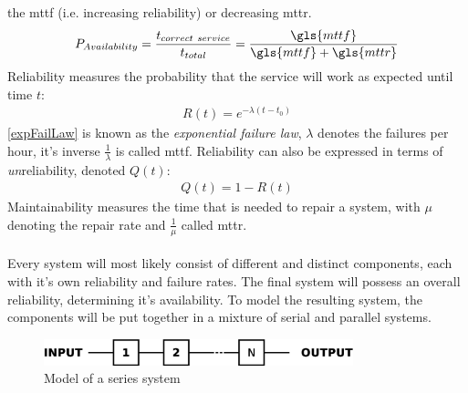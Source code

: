 the \gls{mttf} (i.e. increasing reliability) or decreasing \gls{mttr}.
\begin{align}\label{EQUavailability}
 P_{Availability} = \frac{t_{correct\ service}}{t_{total}} =  \frac{{\gls{mttf}}}{\gls{mttf}+\gls{mttr}}
\end{align}
Reliability measures the probability that the service will work as expected until time $t$:
\begin{align}\label{expFailLaw}
 R(t) = e^{-\lambda(t-t_0)}
\end{align}
\ref{expFailLaw} is known as the \textit{exponential failure law}, $\lambda$ denotes the failures per hour, it's inverse $\frac{1}{\lambda}$ is
called \gls{mttf}. Reliability can also be expressed in terms of \textit{un}reliability, denoted $Q(t)$:
\begin{align}
 Q(t) = 1 - R(t)
\end{align}
Maintainability measures the time that is needed to repair a system, with $\mu$ denoting the repair rate and $\frac{1}{\mu}$ called \gls{mttr}.
\\
\\
Every system will most likely consist of different and distinct components, each with it's own reliability and failure rates. The final system
will possess an overall reliability, determining it's availability. To model the resulting system, the components will be put together in a mixture of
serial and parallel systems.
\begin{figure}
    \centering
    \includegraphics[width=0.8\textwidth]{figures/seriesSystem.eps}
    \caption{Model of a series system}
    \label{fig:serSys}
\end{figure}
